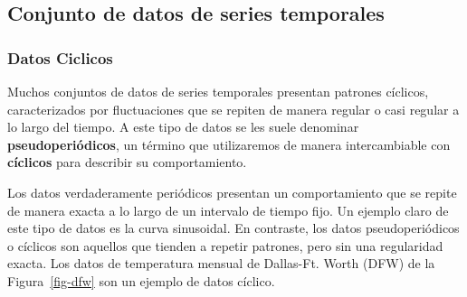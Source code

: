 \documentclass[
  us-letterpaper,
]{scrreprt}
\theoremstyle{plain}
\theoremstyle{definition}
\theoremstyle{definition}
\theoremstyle{remark}
\begin{document}
\subsection{Conjunto de datos de series
temporales}\label{conjunto-de-datos-de-series-temporales}

\subsubsection{Datos Ciclicos}\label{datos-ciclicos}

Muchos conjuntos de datos de series temporales presentan patrones
cíclicos, caracterizados por fluctuaciones que se repiten de manera
regular o casi regular a lo largo del tiempo. A este tipo de datos se
les suele denominar \textbf{pseudoperiódicos}, un término que
utilizaremos de manera intercambiable con \textbf{cíclicos} para
describir su comportamiento.

Los datos verdaderamente periódicos presentan un comportamiento que se
repite de manera exacta a lo largo de un intervalo de tiempo fijo. Un
ejemplo claro de este tipo de datos es la curva sinusoidal. En
contraste, los datos pseudoperiódicos o cíclicos son aquellos que
tienden a repetir patrones, pero sin una regularidad exacta. Los datos
de temperatura mensual de Dallas-Ft. Worth (DFW) de la
Figura~\ref{fig-dfw} son un ejemplo de datos cíclico.
\end{document}
